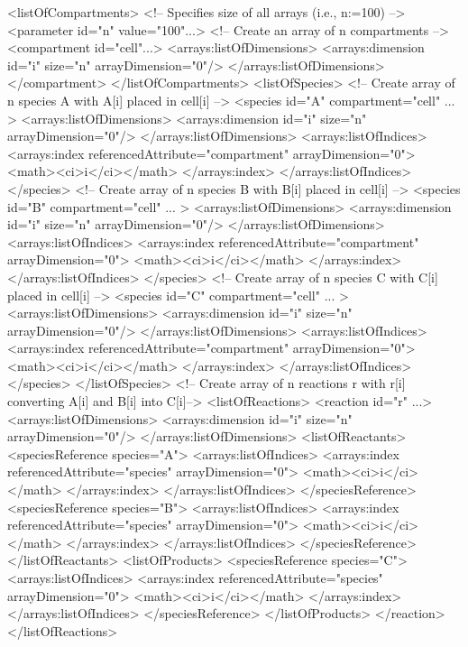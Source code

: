 \begin{example}
<listOfCompartments> 
<!-- Specifies size of all arrays (i.e., n:=100) -->
<parameter id="n" value="100"...>
<!-- Create an array of n compartments -->
 <compartment id="cell"...>
  <arrays:listOfDimensions>
   <arrays:dimension id="i" size="n" arrayDimension="0"/>
  </arrays:listOfDimensions>
 </compartment>
</listOfCompartments> 
<listOfSpecies>
 <!-- Create array of n species A with A[i] placed in cell[i] -->
 <species id="A" compartment="cell" ... > 
  <arrays:listOfDimensions>
   <arrays:dimension id="i" size="n" arrayDimension="0"/>
  </arrays:listOfDimensions>
  <arrays:listOfIndices>
   <arrays:index referencedAttribute="compartment" arrayDimension="0">
    <math><ci>i</ci></math>
   </arrays:index>
  </arrays:listOfIndices>
 </species>
 <!-- Create array of n species B with B[i] placed in cell[i] -->
 <species id="B" compartment="cell" ... > 
  <arrays:listOfDimensions>
   <arrays:dimension id="i" size="n" arrayDimension="0"/>
  </arrays:listOfDimensions>
  <arrays:listOfIndices>
   <arrays:index referencedAttribute="compartment" arrayDimension="0">
    <math><ci>i</ci></math>
   </arrays:index>
  </arrays:listOfIndices>
 </species>
 <!-- Create array of n species C with C[i] placed in cell[i] -->
 <species id="C" compartment="cell" ... >
  <arrays:listOfDimensions>
   <arrays:dimension id="i" size="n" arrayDimension="0"/>
  </arrays:listOfDimensions>
  <arrays:listOfIndices>
   <arrays:index referencedAttribute="compartment" arrayDimension="0">
    <math><ci>i</ci></math>
   </arrays:index>
  </arrays:listOfIndices>
 </species>
</listOfSpecies>
<!-- Create array of n reactions r with r[i] converting A[i] and B[i] into C[i]-->
<listOfReactions>
 <reaction id="r" ...> 
  <arrays:listOfDimensions>
   <arrays:dimension id="i" size="n" arrayDimension="0"/>
  </arrays:listOfDimensions>
  <listOfReactants>
   <speciesReference species="A">
    <arrays:listOfIndices>
     <arrays:index referencedAttribute="species" arrayDimension="0">
      <math><ci>i</ci></math>
     </arrays:index>
    </arrays:listOfIndices>
   </speciesReference>
   <speciesReference species="B"> 
    <arrays:listOfIndices>
     <arrays:index referencedAttribute="species" arrayDimension="0">
      <math><ci>i</ci></math>
     </arrays:index>
    </arrays:listOfIndices>
   </speciesReference>
  </listOfReactants> 
  <listOfProducts>
   <speciesReference species="C"> 
    <arrays:listOfIndices>
     <arrays:index referencedAttribute="species" arrayDimension="0">
      <math><ci>i</ci></math>
     </arrays:index>
    </arrays:listOfIndices>
   </speciesReference>
  </listOfProducts>
 </reaction>
</listOfReactions>
\end{example}


